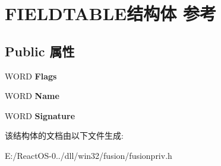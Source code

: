 \hypertarget{struct_f_i_e_l_d_t_a_b_l_e}{}\section{F\+I\+E\+L\+D\+T\+A\+B\+L\+E结构体 参考}
\label{struct_f_i_e_l_d_t_a_b_l_e}
\subsection*{Public 属性}
\begin{DoxyCompactItemize}
\item 
\mbox{\label{struct_f_i_e_l_d_t_a_b_l_e_a70d61ef5982ed3cf1baf2b212f087476}} 
W\+O\+RD {\bfseries Flags}
\item 
\mbox{\label{struct_f_i_e_l_d_t_a_b_l_e_ad5d0403b9ccf10fdc9b15bb61779d9db}} 
W\+O\+RD {\bfseries Name}
\item 
\mbox{\label{struct_f_i_e_l_d_t_a_b_l_e_a904a79d0e35576e34847ff3690d77994}} 
W\+O\+RD {\bfseries Signature}
\end{DoxyCompactItemize}


该结构体的文档由以下文件生成\+:\begin{DoxyCompactItemize}
\item 
E\+:/\+React\+O\+S-\/0../dll/win32/fusion/fusionpriv.\+h\end{DoxyCompactItemize}
